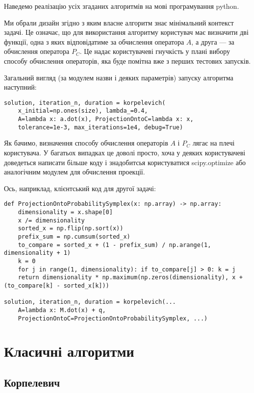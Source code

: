 Наведемо реалізацію усіх згаданих алгоритмів на мові програмування python.

\begin{remark}
    Ми обрали дизайн згідно з яким власне алгоритм знає мінімальний контекст задачі. Це означає, що для використання алгоритму користувач має визначити дві функції, одна з яких відповідатиме за обчислення оператора $A$, а друга --- за обчислення оператора $P_C$. Це надає користувачеві гнучкість у плані вибору способу обчислення операторів, яка буде помітна вже з перших тестових запусків.
\end{remark}

Загальний вигляд (за модулем назви і деяких параметрів) запуску алгоритма наступний:
\begin{verbatim}
solution, iteration_n, duration = korpelevich(
    x_initial=np.ones(size), lambda_=0.4,
    A=lambda x: a.dot(x), ProjectionOntoC=lambda x: x,
    tolerance=1e-3, max_iterations=1e4, debug=True)
\end{verbatim}

Як бачимо, визначення способу обчислення операторів $A$ і $P_C$ лягає на плечі користувача. У багатьох випадках це доволі просто, хоча у деяких користувачеві доведеться написати більше коду і знадобитсья користуватися scipy.optimize або  аналогічним модулем для обчислення проекції. \medskip

Ось, наприклад, клієнтський код для другої задачі:

\begin{verbatim}
def ProjectionOntoProbabilitySymplex(x: np.array) -> np.array:
    dimensionality = x.shape[0]
    x /= dimensionality
    sorted_x = np.flip(np.sort(x))
    prefix_sum = np.cumsum(sorted_x)
    to_compare = sorted_x + (1 - prefix_sum) / np.arange(1, dimensionality + 1)
    k = 0
    for j in range(1, dimensionality): if to_compare[j] > 0: k = j
    return dimensionality * np.maximum(np.zeros(dimensionality), x + (to_compare[k] - sorted_x[k]))

solution, iteration_n, duration = korpelevich(...
    A=lambda x: M.dot(x) + q,
    ProjectionOntoC=ProjectionOntoProbabilitySymplex, ...)
\end{verbatim}

\newpage
\section{Класичні алгоритми}

\subsection{Корпелевич}
\inputminted[linenos,firstline=8,fontsize=\tiny]{python}{src/core/korpelevich.py}

